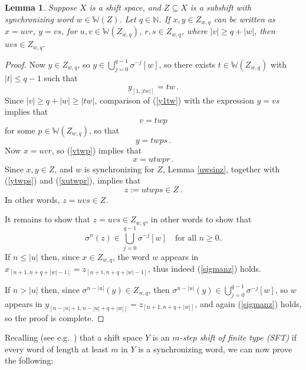 \documentclass[reqno,11pt]{amsart}
\newtheorem{lem}[thm]{Lemma}
\theoremstyle{definition}
\theoremstyle{remark}
\theoremstyle{remark}
\def \N {\mathbb N}
\def\w{\mathbb{W}}
\numberwithin{equation}{section}
\begin{document}
\begin{lem}\label{zwqpresftlemma}
Suppose $X$ is a shift space,
and $Z\subseteq X$ is a subshift with synchronizing word $w\in\w(Z)$.
Let $q\in\N$.
If $x,y\in Z_{w,q}$ can be written as $x=uvr$, $y=vs$, for $u,v\in \w(Z_{w,q})$, $r,s\in Z_{w,q}$,
where $|v|\ge q+|w|$, then $uvs\in Z_{w,q}$.
\end{lem}
\begin{proof}
Now $y\in Z_{w,q}$, so $y\in \bigcup_{j=0}^{q-1}\sigma^{-j}[w]$,
so there exists $t\in\w(Z_{w,q})$ with $|t|\le q-1$ such that
\begin{equation}\label{y1tw}
y_{[1,|tw|]}=tw\,.
\end{equation}
Since $|v|\ge q+|w|\ge |tw|$,
comparison of (\ref{y1tw}) with the expression $y=vs$ implies that 
\begin{equation}\label{vtwp}
v=twp
\end{equation}
 for some $p\in\w(Z_{w,q})$, so that
\begin{equation}\label{ytwps}
y=twps\,.
\end{equation}
Now $x=uvr$, so (\ref{vtwp}) implies that
\begin{equation}\label{xutwpr}
x=utwpr\,.
\end{equation}
Since $x,y\in Z$, and $w$ is synchronizing for $Z$,
Lemma \ref{uwsinz}, together with (\ref{ytwps}) and (\ref{xutwpr}),
implies that
\begin{equation}\label{zutwps}
z:=utwps \in Z\,.
\end{equation}
In other words, $z=uvs\in Z$. 

It remains to show that $z=uvs\in Z_{w,q}$, in other words to show that
\begin{equation}\label{sigmanz}
\sigma^n(z)\in \bigcup_{j=0}^{q-1} \sigma^{-j}[w]\quad\text{for all }n\ge 0.
\end{equation}
If $n\le |u|$ then, since $x\in Z_{w,q}$, the word $w$ appears in 
$x_{[n+1,n+q+|w|-1]}
=
z_{[n+1,n+q+|w|-1]}$, thus indeed (\ref{sigmanz}) holds.

If $n>|u|$ then, since $\sigma^{n-|u|}(y)\in Z_{w,q}$, then
$\sigma^{n-|u|}(y)\in \bigcup_{j=0}^{q-1} \sigma^{-j}[w]$, so $w$ appears
in
$y_{[n-|u|+1,n-|u|+q+|w|]}
=
z_{[n+1,n+q+|w|]}$, and again  (\ref{sigmanz}) holds, so the proof is complete.
\end{proof}


Recalling (see e.g.~\cite[Thm.~2.1.8]{LM95}) that a shift space $Y$ is an \emph{$m$-step shift of finite type (SFT)}
if every word of length at least $m$ in $Y$ is a synchronizing word, we can now prove the following:
\end{document}
